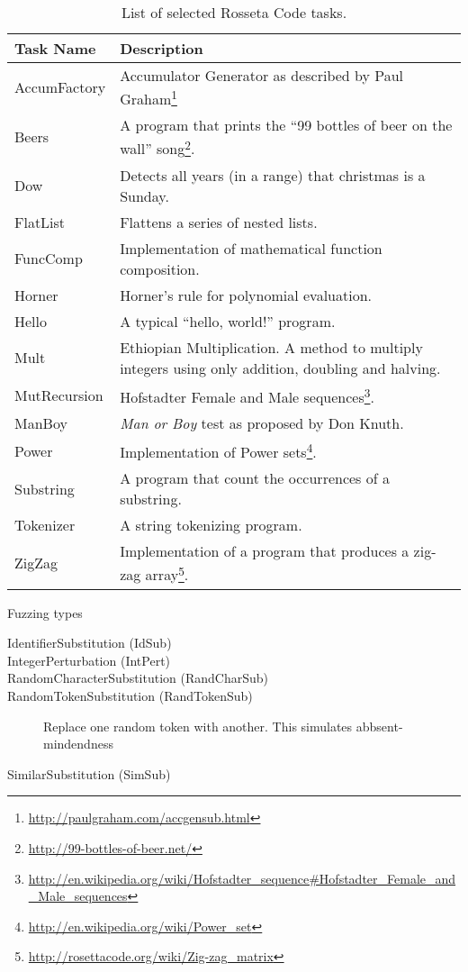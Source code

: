 \documentclass[10pt]{sigplanconf}
\begin{document}
\begin{table}
\begin{center}
\caption{List of selected Rosseta Code tasks.}
\label{tab:Tasks}
\begin{tabular}{ l p{5cm}}
 \hline
Task Name & Description\\
\hline
AccumFactory & Accumulator Generator as described by Paul Graham\footnote{\url{http://paulgraham.com/accgensub.html}}\\
Beers & A program that prints the ``99 bottles of beer on the wall'' song\footnote{\url{http://99-bottles-of-beer.net/}}.\\
Dow & Detects all years (in a range) that christmas is a Sunday.\\
FlatList & Flattens a series of nested lists.\\
FuncComp & Implementation of mathematical function composition.\\
Horner & Horner's rule for polynomial evaluation.\\
Hello & A typical ``hello, world!'' program.\\
Mult & Ethiopian Multiplication. A method to multiply integers using only addition, doubling and halving.\\
MutRecursion & Hofstadter Female and Male sequences\footnote{\url{http://en.wikipedia.org/wiki/Hofstadter_sequence#Hofstadter_Female_and_Male_sequences}}.\\
ManBoy & \textit{Man or Boy} test as proposed by Don Knuth.\\
Power & Implementation of Power sets\footnote{\url{http://en.wikipedia.org/wiki/Power_set}}.\\
Substring & A program that count the occurrences of a substring.\\
Tokenizer & A string tokenizing program.\\
ZigZag & Implementation of a program that produces a zig-zag array\footnote{\url{http://rosettacode.org/wiki/Zig-zag_matrix}}.\\
\hline
\end{tabular}
\end{center}
\end{table}

Fuzzing types

\begin{description}
	\item [IdentifierSubstitution (IdSub)]
	\item [IntegerPerturbation (IntPert)]
	\item [RandomCharacterSubstitution (RandCharSub)]
	\item [RandomTokenSubstitution (RandTokenSub)] Replace one random token with another. This simulates abbsent-mindendness

	\item [SimilarSubstitution (SimSub)]
\end{description}
\end{document}
